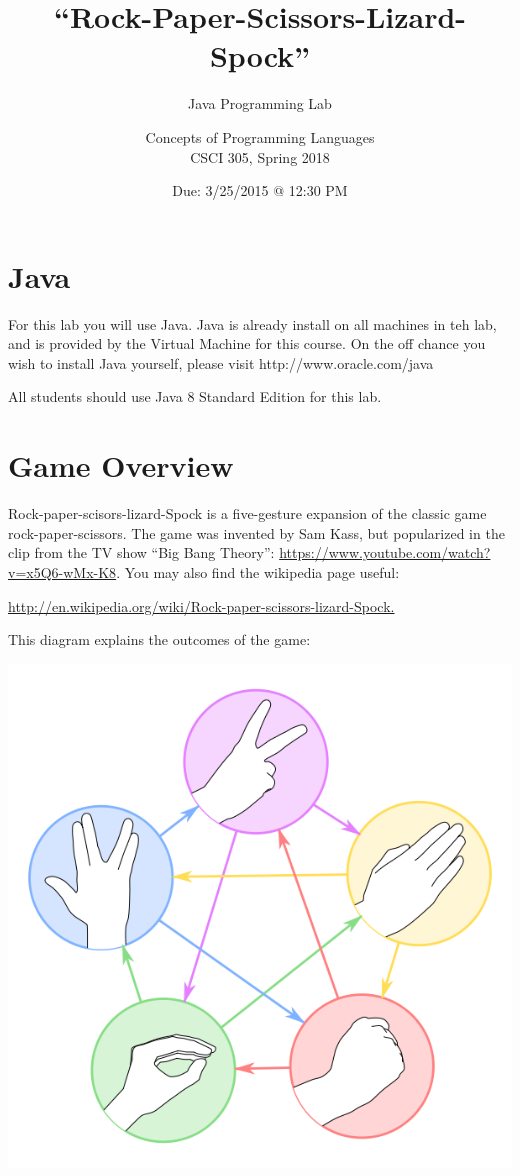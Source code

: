 \documentclass{article}
\title{``Rock-Paper-Scissors-Lizard-Spock''}
\subtitle{Java Programming Lab}
\author{Concepts of Programming Languages\\CSCI 305, Spring 2018}
\date{Due: 3/25/2015 @ 12:30 PM}
\begin{document}
\maketitle

\section*{Java}
For this lab you will use Java. Java is already install on all machines in teh lab, and is provided by the Virtual Machine for this course. On the off chance you wish to install Java yourself, please visit http://www.oracle.com/java

All students should use Java 8 Standard Edition for this lab.

\section*{Game Overview}
Rock-paper-scisors-lizard-Spock is a five-gesture expansion of the classic game rock-paper-scissors. The game was invented by Sam Kass, but popularized in the clip from the TV show ``Big Bang Theory'': \url{https://www.youtube.com/watch?v=x5Q6-wMx-K8}. You may also find the wikipedia page useful:

\begin{center} \url{http://en.wikipedia.org/wiki/Rock-paper-scissors-lizard-Spock.} \end{center}

\noindent This diagram explains the outcomes of the game:

\begin{center}
 \includegraphics[scale=0.25]{images/RPSLS.png}
\end{center}
\end{document}
